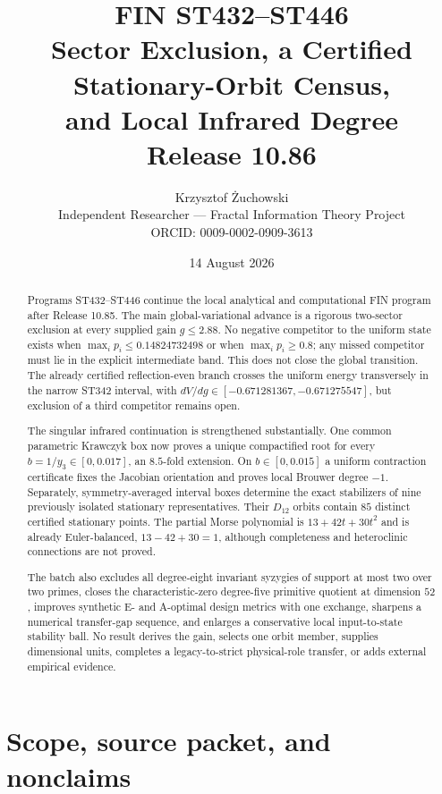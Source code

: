 \documentclass[11pt,a4paper]{article}
\title{\textbf{FIN ST432--ST446}\\[3pt]
Sector Exclusion, a Certified Stationary-Orbit Census,\\
and Local Infrared Degree\\[6pt]
\large Release 10.86}
\author{Krzysztof \.{Z}uchowski\\
\small Independent Researcher --- Fractal Information Theory Project\\
\small ORCID: 0009-0002-0909-3613}
\date{14 August 2026}
\begin{document}
\maketitle

\begin{abstract}
Programs ST432--ST446 continue the local analytical and computational FIN
program after Release 10.85.  The main global-variational advance is a rigorous
two-sector exclusion at every supplied gain $g\le2.88$.  No negative
competitor to the uniform state exists when
$\max_i p_i\le0.14824732498$ or when $\max_i p_i\ge0.8$; any missed
competitor must lie in the explicit intermediate band.  This does not close
the global transition.  The already certified reflection-even branch crosses
the uniform energy transversely in the narrow ST342 interval, with
$dV/dg\in[-0.671281367,-0.671275547]$, but exclusion of a third competitor
remains open.

The singular infrared continuation is strengthened substantially.  One common
parametric Krawczyk box now proves a unique compactified root for every
$b=1/y_3\in[0,0.017]$, an $8.5$-fold extension.  On $b\in[0,0.015]$ a uniform
contraction certificate fixes the Jacobian orientation and proves local
Brouwer degree $-1$.  Separately, symmetry-averaged interval boxes determine
the exact stabilizers of nine previously isolated stationary representatives.
Their $D_{12}$ orbits contain $85$ distinct certified stationary points.  The
partial Morse polynomial is $13+42t+30t^2$ and is already Euler-balanced,
$13-42+30=1$, although completeness and heteroclinic connections are not
proved.

The batch also excludes all degree-eight invariant syzygies of support at most
two over two primes, closes the characteristic-zero degree-five primitive
quotient at dimension $52$, improves synthetic E- and A-optimal design metrics
with one exchange, sharpens a numerical transfer-gap sequence, and enlarges a
conservative local input-to-state stability ball.  No result derives the gain,
selects one orbit member, supplies dimensional units, completes a
legacy-to-strict physical-role transfer, or adds external empirical evidence.
\end{abstract}

\tableofcontents
\newpage

\section{Scope, source packet, and nonclaims}
\end{document}
